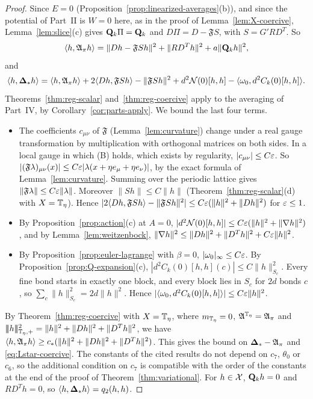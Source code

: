 \begin{proof}
Since $E=0$ (Proposition~\ref{prop:linearized-averages}(b)), and since the potential of Part~II is $W=0$ here, as in the proof of Lemma~\ref{lem:X-coercive}, Lemma~\ref{lem:slice}(c) gives $\mathbf Q_k\Pi=\mathbf Q_k$ and $D\Pi=D-\mathfrak FS$, with $S=G'RD^T$. So
\[
\langle h,\mathfrak A_\pi h\rangle=\|Dh-\mathfrak FSh\|^2+\|RD^Th\|^2+a\|\mathbf Q_kh\|^2,
\]
and
\[
\langle h,\boldsymbol{\Delta}_*h\rangle=\langle h,\mathfrak A_\pi h\rangle+2\langle Dh,\mathfrak FSh\rangle-\|\mathfrak FSh\|^2+d^2\mathcal N(0)[h,h]-\langle \omega_0,d^2C_k(0)[h,h]\rangle .
\]
Theorems~\ref{thm:reg-scalar} and~\ref{thm:reg-coercive} apply to the averaging of Part~IV, by Corollary~\ref{cor:parts-apply}. We bound the last four terms.
\begin{itemize}
\item The coefficients $c_{\mu\nu}$ of $\mathfrak F$ (Lemma~\ref{lem:curvature}) change under a real gauge transformation by multiplication with orthogonal matrices on both sides. In a local gauge in which (B) holds, which exists by regularity, $|c_{\mu\nu}|\le C\varepsilon$. So $|(\mathfrak F\lambda)_{\mu\nu}(x)|\le C\varepsilon|\lambda(x+\eta e_\mu+\eta e_\nu)|$, by the exact formula of Lemma~\ref{lem:curvature}. Summing over the periodic lattice gives $\|\mathfrak F\lambda\|\le C\varepsilon\|\lambda\|$. Moreover $\|Sh\|\le C\|h\|$ (Theorem~\ref{thm:reg-scalar}(d) with $X=\mathbb T_\eta$). Hence $|2\langle Dh,\mathfrak FSh\rangle-\|\mathfrak FSh\|^2|\le C\varepsilon(\|h\|^2+\|Dh\|^2)$ for $\varepsilon\le1$.
\item By Proposition~\ref{prop:action}(c) at $A=0$, $|d^2\mathcal N(0)[h,h]|\le C\varepsilon(\|h\|^2+\|\nabla h\|^2)$, and by Lemma~\ref{lem:weitzenbock}, $\|\nabla h\|^2\le\|Dh\|^2+\|D^Th\|^2+C\varepsilon\|h\|^2$.
\item By Proposition~\ref{prop:euler-lagrange} with $\beta=0$, $|\omega_0|_\infty\le C\varepsilon$. By Proposition~\ref{prop:Q-expansion}(c), $|d^2C_k(0)[h,h](c)|\le C\|h\|^2_{S_c}$. Every fine bond starts in exactly one block, and every block lies in $S_c$ for $2d$ bonds $c$, so $\sum_c\|h\|^2_{S_c}=2d\|h\|^2$. Hence $|\langle \omega_0,d^2C_k(0)[h,h]\rangle|\le C\varepsilon\|h\|^2$.
\end{itemize}
By Theorem~\ref{thm:reg-coercive} with $X=\mathbb T_\eta$, where $m_{\mathbb T_\eta}=0$, $\mathfrak A^{\mathbb T_\eta}=\mathfrak A_\pi$ and $|\!|\!|h|\!|\!|_{\mathbb T_\eta,+}^2=\|h\|^2+\|Dh\|^2+\|D^Th\|^2$, we have $\langle h,\mathfrak A_\pi h\rangle\ge c_*(\|h\|^2+\|Dh\|^2+\|D^Th\|^2)$. This gives the bound on $\boldsymbol{\Delta}_*-\mathfrak A_\pi$ and \eqref{eq:Lstar-coercive}. The constants of the cited results do not depend on $c_7$, $\theta_0$ or $c_6$, so the additional condition on $c_7$ is compatible with the order of the constants at the end of the proof of Theorem~\ref{thm:variational}. For $h\in\mathcal X$, $\mathbf Q_kh=0$ and $RD^Th=0$, so $\langle h,\boldsymbol{\Delta}_*h\rangle=q_2(h,h)$.
\end{proof}
